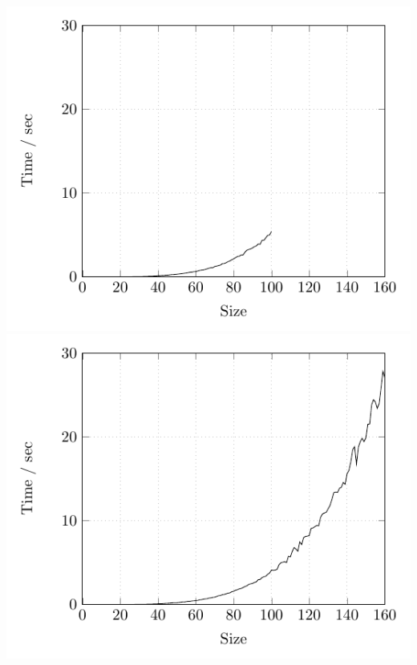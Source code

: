 \subsection{} %
	\includegraphics{Tests/List/list}
	\includegraphics{Tests/Tree/tree}
	
\subsection{} %


